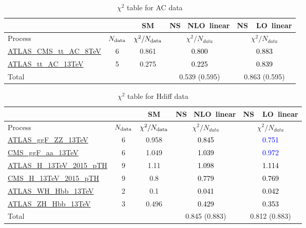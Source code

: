 \documentclass{article}
\begin{document}
\begin{table}[H]
\centering
\begin{tabular}{|l|c|c|c|c|}
\hline
 \multicolumn{2}{|c|}{} & SM& \rm NS \ NLO\ linear& \rm NS\ \ LO\ linear\\ \hline
Process & $N_{\rm data}$ & $\chi^ 2/N_{\rm data}$& $\chi^ 2/N_{data}$& $\chi^ 2/N_{data}$\\ \hline
\href{https://arxiv.org/abs/1709.05327}{ATLAS_CMS_tt_AC_8TeV} & 6 & 0.861 & \textcolor{black}                            {0.800} & \textcolor{black}                            {0.883} \\ \hline
\href{https://cds.cern.ch/record/2682109}{ATLAS_tt_AC_13TeV} & 5 & 0.275 & \textcolor{black}                            {0.225} & \textcolor{black}                            {0.839} \\ \hline
\hline Total & &  & 0.539 (0.595) & 0.863 (0.595) \\ \hline
\end{tabular}
\caption{$\chi^2$ table for AC data}
\end{table}
\begin{table}[H]
\centering
\begin{tabular}{|l|c|c|c|c|}
\hline
 \multicolumn{2}{|c|}{} & SM& \rm NS \ NLO\ linear& \rm NS\ \ LO\ linear\\ \hline
Process & $N_{\rm data}$ & $\chi^ 2/N_{\rm data}$& $\chi^ 2/N_{data}$& $\chi^ 2/N_{data}$\\ \hline
\href{https://arxiv.org/abs/1909.02845}{ATLAS_ggF_ZZ_13TeV} & 6 & 0.958 & \textcolor{black}                            {0.845} & \textcolor{blue}                            {0.751} \\ \hline
\href{https://inspirehep.net/literature/1725274}{CMS_ggF_aa_13TeV} & 6 & 1.049 & \textcolor{black}                            {1.039} & \textcolor{blue}                            {0.972} \\ \hline
\href{https://inspirehep.net/literature/1743896}{ATLAS_H_13TeV_2015_pTH} & 9 & 1.11 & \textcolor{black}                            {1.098} & \textcolor{black}                            {1.114} \\ \hline
\href{https://arxiv.org/abs/1812.06504}{CMS_H_13TeV_2015_pTH} & 9 & 0.8 & \textcolor{black}                            {0.779} & \textcolor{black}                            {0.769} \\ \hline
\href{https://arxiv.org/abs/1903.04618}{ATLAS_WH_Hbb_13TeV} & 2 & 0.1 & \textcolor{black}                            {0.041} & \textcolor{black}                            {0.042} \\ \hline
\href{https://arxiv.org/abs/1903.04618}{ATLAS_ZH_Hbb_13TeV} & 3 & 0.496 & \textcolor{black}                            {0.429} & \textcolor{black}                            {0.353} \\ \hline
\hline Total & &  & 0.845 (0.883) & 0.812 (0.883) \\ \hline
\end{tabular}
\caption{$\chi^2$ table for Hdiff data}
\end{table}
\end{document}
